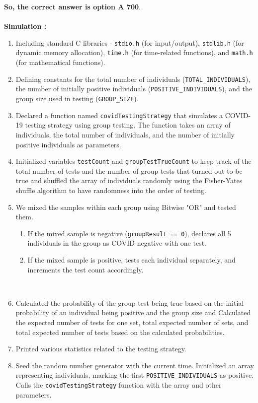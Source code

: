 \documentclass[journal,12pt,onecolumn]{IEEEtran}
\begin{document}
\textbf{So, the correct answer is option A 700}. \\ \\
\textbf{Simulation :} \\ 
\begin{enumerate}
    \item Including standard C libraries - \texttt{stdio.h} (for input/output), \texttt{stdlib.h} (for dynamic memory allocation), \texttt{time.h} (for time-related functions), and \texttt{math.h} (for mathematical functions). \\
    \item Defining constants for the total number of individuals (\texttt{TOTAL\_INDIVIDUALS}), the number of initially positive individuals (\texttt{POSITIVE\_INDIVIDUALS}), and the group size used in testing (\texttt{GROUP\_SIZE}). \\
    \item Declared a function named \texttt{covidTestingStrategy} that simulates a COVID-19 testing strategy using group testing. The function takes an array of individuals, the total number of individuals, and the number of initially positive individuals as parameters. \\
    \item Initialized variables \texttt{testCount} and \texttt{groupTestTrueCount} to keep track of the total number of tests and the number of group tests that turned out to be true and shuffled the array of individuals randomly using the Fisher-Yates shuffle algorithm to have randomness into the order of testing. \\
    \item We mixed the samples within each group using Bitwise "OR" and tested them.
    \begin{enumerate}
        \item If the mixed sample is negative (\texttt{groupResult == 0}), declares all 5 individuals in the group as COVID negative with one test.
        \item If the mixed sample is positive, tests each individual separately, and increments the test count accordingly.
    \end{enumerate} \\
    \item Calculated the probability of the group test being true based on the initial probability of an individual being positive and the group size and Calculated the expected number of tests for one set, total expected number of sets, and total expected number of tests based on the calculated probabilities. \\
    \item Printed various statistics related to the testing strategy. \\
    \item Seed the random number generator with the current time. Initialized an array representing individuals, marking the first \texttt{POSITIVE\_INDIVIDUALS} as positive. Calls the \texttt{covidTestingStrategy} function with the array and other parameters.
\end{enumerate} \\ \\
\end{document}
